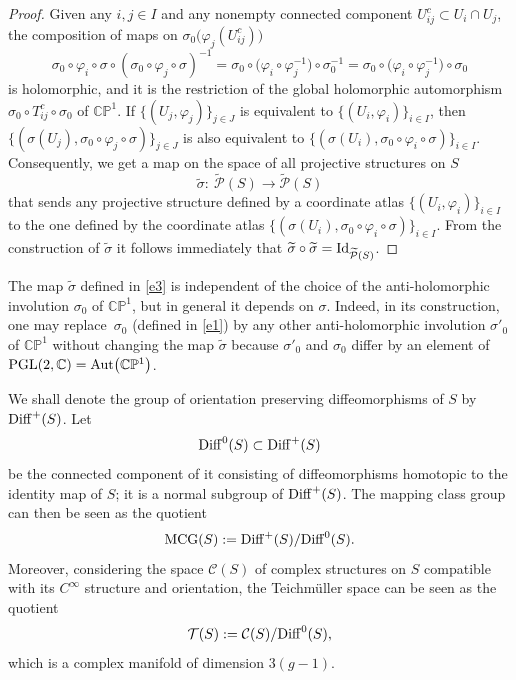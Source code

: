 \documentclass[pdftex]{sigma}
\numberwithin{equation}{section}
\begin{document}
\begin{proof}
Given any $i, j \in I$ and any nonempty connected component $U^c_{ij} \subset U_i\cap U_j$,
the composition of maps on $\sigma_0\bigl(\varphi_j(U^c_{ij})\bigr)$
\[
\sigma_0\circ\varphi_i\circ\sigma\circ (\sigma_0\circ\varphi_j\circ\sigma)^{-1} =
\sigma_0\circ \bigl(\varphi_i\circ \varphi^{-1}_j\bigr)\circ\sigma^{-1}_0 =
\sigma_0\circ \bigl(\varphi_i\circ \varphi^{-1}_j\bigr)\circ\sigma_0
\]
is holomorphic, and it is the restriction of the global holomorphic automorphism
$\sigma_0\circ T^c_{ij}\circ\sigma_0$ of ${\mathbb C}{\mathbb P}^1$.
If $\{(U_j, \varphi_j)\}_{j\in J}$ is
equivalent to $\{(U_i, \varphi_i)\}_{i\in I}$, then $\{(\sigma(U_j),
\sigma_0\circ\varphi_j\circ\sigma)\}_{j\in J}$ is also equivalent to $\{(\sigma(U_i),
\sigma_0\circ\varphi_i\circ\sigma)\}_{i\in I}$. Consequently, we get a map on the space of all projective structures on $S$
\begin{equation}\label{e3}
\widetilde{\sigma} \colon\ \widetilde{\mathcal P}(S)
\longrightarrow \widetilde{\mathcal P}(S)
\end{equation}
that sends any projective structure defined by a coordinate
atlas $\{(U_i, \varphi_i)\}_{i\in I}$ to the one defined by the
coordinate atlas $\{(\sigma(U_i), \sigma_0\circ\varphi_i\circ\sigma)\}_{i\in I}$. From the construction of
$\widetilde{\sigma}$ it follows immediately that
 $\widetilde{\sigma}\circ\widetilde{\sigma} = {\rm Id}_{\widetilde{\mathcal
P}(S)}$.
\end{proof}

\begin{Remark}\label{rem1}
The map $\widetilde{\sigma}$ defined in \eqref{e3} is independent
of the choice of the anti-holomorphic involution $\sigma_0$ of ${\mathbb C}{\mathbb P}^1$, but
in general it depends on $\sigma$. Indeed, in its construction, one may replace~$\sigma_0$ (defined in \eqref{e1}) by any other anti-holomorphic involution $\sigma'_0$ of
${\mathbb C}{\mathbb P}^1$ without changing the map $\widetilde{\sigma}$ because
$\sigma'_0$ and $\sigma_0$ differ by an element of ${\rm PGL}(2,{\mathbb C}) =
{\rm Aut}\bigl({\mathbb C}{\mathbb P}^1\bigr)$.
\end{Remark}

We shall denote the group of orientation preserving diffeomorphisms of $S$ by ${\rm Diff}^+(S)$. Let
\[
{\rm Diff}^0(S) \subset {\rm Diff}^+(S)
\]
be the connected component of it consisting of diffeomorphisms homotopic to the
identity map of $S$; it is a normal subgroup of ${\rm Diff}^+(S)$. The
mapping class group can then be seen as the quotient
\[
{\rm MCG}(S) := {\rm Diff}^+(S)/{\rm Diff}^0(S).
\]
Moreover, considering the space ${\mathcal C}(S)$ of complex structures on $S$
compatible with its $C^\infty$ structure and orientation, the Teichm\"uller space can be seen as the quotient
\begin{equation}\label{e5}
{\mathcal T}(S) := {\mathcal C}(S)/{\rm Diff}^0(S),
\end{equation}
which is a complex manifold of dimension $3(g-1)$.
\end{document}
